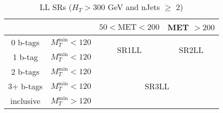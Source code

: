 \documentclass[plain,landscape]{article}
\begin{document}
\begin{table}
\centering
\begin{tabular}{|c|c|c|c|}
\hline
&  & $50 < \textrm{MET} < 200$ & MET $> 200$ \\
\hline
0 b-tags & $M_T^{\textrm{min}} < 120$ &  \multirow{2}{*}{SR1LL} &  \multirow{2}{*}{SR2LL} \\
\cline{1-2}
1 b-tag & $M_T^{\textrm{min}} < 120$ & &  \\
\hline
2 b-tags & $M_T^{\textrm{min}} < 120$ & \multicolumn{2}{|c|}{\multirow{3}{*}{SR3LL}} \\
\cline{1-2}
3+ b-tags & $M_T^{\textrm{min}} < 120$ & \multicolumn{2}{|c|}{} \\
\cline{1-2}
inclusive & $M_T^{\textrm{min}} > 120$ &  \multicolumn{2}{|c|}{} \\ 
\hline
\end{tabular}
\caption{LL SRs ($H_T > 300$ GeV and nJets $\geq$ 2)}
\end{table}
\end{document}
